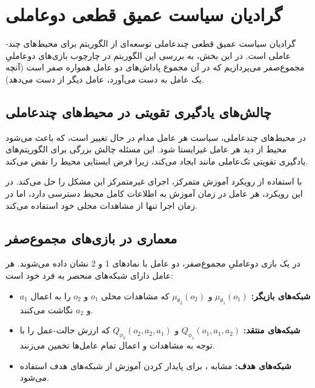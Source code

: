 \section{ گرادیان سیاست عمیق قطعی 
دو­عاملی
}

گرادیان سیاست عمیق قطعی چند­عاملی
توسعه‌ای از الگوریتم  برای محیط‌های چند­عاملی است. در این بخش، به بررسی این الگوریتم در چارچوب بازی‌های دو­عاملیِ مجموع­‌صفر می‌پردازیم که در آن مجموع پاداش‌های دو عامل همواره صفر است (آنچه یک عامل به دست می‌آورد، عامل دیگر از دست می‌دهد).

\subsection{چالش‌های یادگیری تقویتی در محیط‌های چند­عاملی}

در محیط‌های چند­عاملی، سیاست هر عامل مدام در حال تغییر است، که باعث می‌شود محیط از دید هر عامل غیرایستا شود. این مسئله چالش بزرگی برای الگوریتم‌های یادگیری تقویتی تک‌عاملی مانند  ایجاد می‌کند، زیرا فرض ایستایی محیط را نقض می‌کند.

 با استفاده از رویکرد آموزش متمرکز، اجرای غیرمتمرکز این مشکل را حل می‌کند. در این رویکرد، هر عامل در زمان آموزش به اطلاعات کامل محیط دسترسی دارد، اما در زمان اجرا تنها از مشاهدات محلی خود استفاده می‌کند.

\subsection{معماری  در بازی‌های مجموع­‌صفر}

در یک بازی دو­عاملیِ مجموع­‌صفر، دو عامل با نمادهای 1 و 2 نشان داده می‌شوند. هر عامل دارای شبکه‌های منحصر به فرد خود است:

\begin{itemize}
    \item \textbf{شبکه‌های بازیگر:} $\mu_{\theta_1}(o_1)$ و $\mu_{\theta_2}(o_2)$ که مشاهدات محلی $o_1$ و $o_2$ را به اعمال $a_1$ و $a_2$ نگاشت می‌کنند.
    \item \textbf{شبکه‌های منتقد:} $Q_{\phi_1}(o_1, a_1, a_2)$ و $Q_{\phi_2}(o_2, a_2, a_1)$ که ارزش حالت-عمل را با توجه به مشاهدات و اعمال تمام عامل‌ها تخمین می‌زنند.
    \item \textbf{شبکه‌های هدف:} مشابه ، برای پایدار کردن آموزش از شبکه‌های هدف استفاده می‌شود.
\end{itemize}


